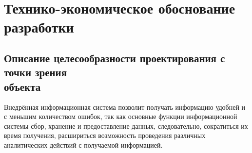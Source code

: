 \section{Технико-экономическое обоснование разработки}
\subsection{Описание целесообразности проектирования с точки зрения \\объекта} 
Внедрённая информационная система позволит получать информацию удобней и с меньшим количеством ошибок, так как основные функции информационной системы сбор, хранение и предоставление данных, следовательно, сократиться их время получения, расшириться возможность проведения различных аналитических действий с получаемой информацией.

